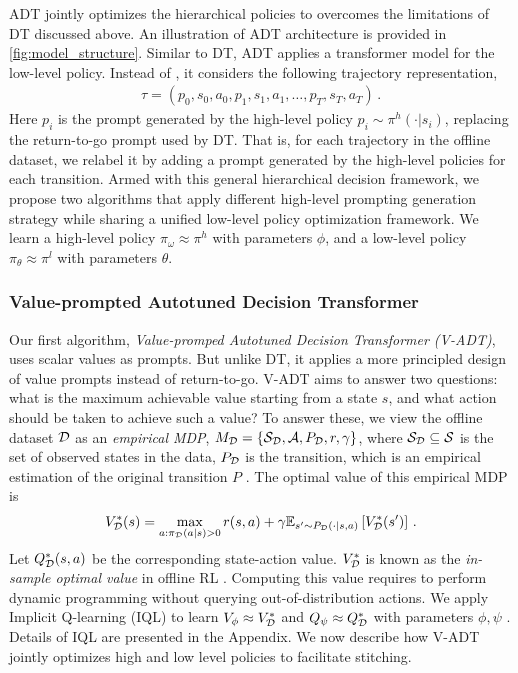 ADT jointly optimizes the hierarchical policies to overcomes the limitations of DT discussed above.  
An illustration of ADT architecture is provided in \cref{fig:model_structure}.  
Similar to DT, ADT applies a transformer model for the low-level policy. 
Instead of , it considers the following trajectory representation, 
 \begin{align}
 \tau = \left( p_0, s_0, a_0, p_1, s_1, a_1, \dots, p_{T}, s_{T}, a_{T}\right)\, .
 \label{eq:adt-traj}
 \end{align}
Here $p_i$ is the prompt generated by the high-level policy $p_i \sim \pi^h(\cdot | s_i)$, replacing the return-to-go prompt used by DT.   
That is, for each trajectory in the offline dataset, we relabel it by adding a prompt generated by the high-level policies for each transition. 
Armed with this general hierarchical decision framework, we propose two algorithms that apply different high-level prompting generation strategy while sharing a unified low-level policy optimization framework.  
We learn a high-level policy $\pi_\omega\approx \pi^h$ with parameters $\phi$, and a low-level policy $\pi_\theta \approx \pi^l$ with parameters $\theta$. 


\subsubsection{Value-prompted Autotuned Decision Transformer}

Our first algorithm, \emph{Value-promped Autotuned Decision Transformer (V-ADT)}, uses scalar values as prompts. But unlike DT, it applies a more principled design of value prompts instead of return-to-go.  
V-ADT aims to answer two questions: what is the maximum achievable value starting from a state $s$, and what action should be taken to achieve such a value?  
To answer these, we view the offline dataset ${\mathcal{D}}$ as an \emph{empirical MDP}, 
$M_{{\mathcal{D}}}=\{{\mathcal{S}}_{{\mathcal{D}}}, {\mathcal{A}}, P_{{\mathcal{D}}}, r, \gamma\}$, 
where ${\mathcal{S}}_{{\mathcal{D}}}\subseteq {\mathcal{S}}$ is the set of observed states in the data, 
$P_{{\mathcal{D}}}$ is the transition, which is an empirical estimation of the original transition $P$ \citep{fujimoto2019off}.  
The optimal value of this empirical MDP is
\begin{align}
V^*_{{\mathcal{D}}}(s) = \max_{a: \pi_{{\mathcal{D}}}(a | s) > 0} r(s,a) + \gamma \mathbb{E}_{s'\sim P_{{\mathcal{D}}}(\cdot | s,a)} \left[ V^*_{{\mathcal{D}}} (s') \right]\, .
\label{eq:in-sample-v}
\end{align}
Let $Q^*_{{\mathcal{D}}}(s,a)$ be the corresponding state-action value. 
$V^*_{{\mathcal{D}}}$ is known as the \emph{in-sample optimal value} in offline RL  \citep{fujimoto2018addressing,kostrikov2022offline,xiaosample}. 
Computing this value requires to perform dynamic programming without querying out-of-distribution actions.  
We apply Implicit Q-learning (IQL) to learn $V_{\phi}\approx V^*_{{\mathcal{D}}}$ and $Q_{\psi}\approx Q^*_{{\mathcal{D}}}$ with parameters $\phi, \psi$ \citep{kostrikov2022offline}. 
Details of IQL are presented in the Appendix. 
We now describe how V-ADT jointly optimizes high and low level policies to facilitate stitching. 


